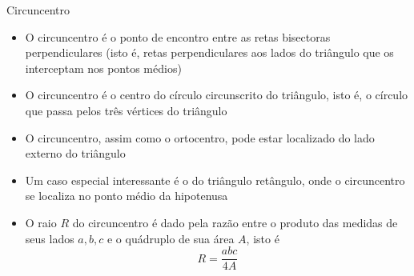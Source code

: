 \begin{frame}[fragile]{Circuncentro}

    \begin{itemize}
        \item O circuncentro é o ponto de encontro entre as retas bisectoras perpendiculares (isto é, retas perpendiculares aos lados do triângulo que os interceptam nos pontos médios)

        \item O circuncentro é o centro do círculo circunscrito do triângulo, isto é, o círculo 
            que passa pelos três vértices do triângulo

        \item O circuncentro, assim como o ortocentro, pode estar localizado do lado externo do triângulo

        \item Um caso especial interessante é o do triângulo retângulo, onde o circuncentro se 
            localiza no ponto médio da hipotenusa

        \item O raio $R$ do circuncentro é dado pela razão entre o produto das medidas de seus 
            lados $a, b, c$ e o quádruplo de sua área $A$, isto é
        \[
            R = \frac{abc}{4A}
        \]

    \end{itemize}

\end{frame}
